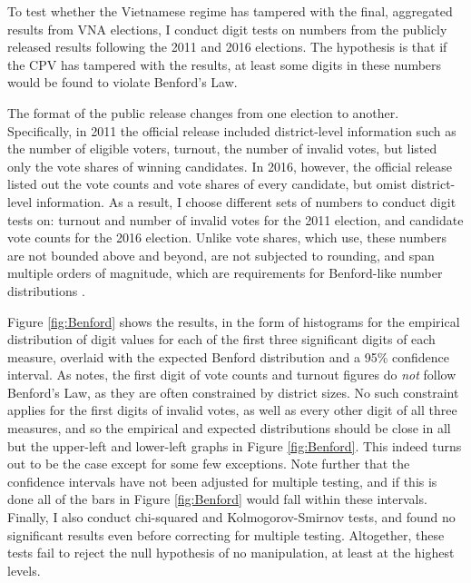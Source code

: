 \documentclass[12pt]{article}
\newcommand{\1}{\mathbbm{1}}
\begin{document}
To test whether the Vietnamese regime has tampered with the final, aggregated results from VNA elections, I conduct digit tests on numbers from the publicly released results following the 2011 and 2016 elections. The hypothesis is that if the CPV has tampered with the results, at least some digits in these numbers would be found to violate Benford's Law. 

The format of the public release changes from one election to another. Specifically, in 2011 the official release included district-level information such as the number of eligible voters, turnout, the number of invalid votes, but listed only the vote shares of winning candidates. In 2016, however, the official release listed out the vote counts and vote shares of every candidate, but omist district-level information. As a result, I choose different sets of numbers to conduct digit tests on: turnout and number of invalid votes for the 2011 election, and candidate vote counts for the 2016 election. Unlike vote shares, which \citet{MaleskySchuler2011} use, these numbers are not bounded above and beyond, are not subjected to rounding, and span multiple orders of magnitude, which are requirements for Benford-like number distributions \citep{Hill1995, Mebane2006, Berger2015}.

Figure \ref{fig:Benford} shows the results, in the form of histograms for the empirical distribution of digit values for each of the first three significant digits of each measure, overlaid with the expected Benford distribution and a 95\% confidence interval. As \citet{Mebane2006} notes, the first digit of vote counts and turnout figures do \textit{not} follow Benford's Law, as they are often constrained by district sizes. No such constraint applies for the first digits of invalid votes, as well as every other digit of all three measures, and so the empirical and expected distributions should be close in all but the upper-left and lower-left graphs in Figure \ref{fig:Benford}. This indeed turns out to be the case except for some few exceptions. Note further that the confidence intervals have not been adjusted for multiple testing, and if this is done all of the bars in Figure \ref{fig:Benford} would fall within these intervals. Finally, I also conduct chi-squared and Kolmogorov-Smirnov tests, and found no significant results even before correcting for multiple testing. Altogether, these tests fail to reject the null hypothesis of no manipulation, at least at the highest levels.
\end{document}
